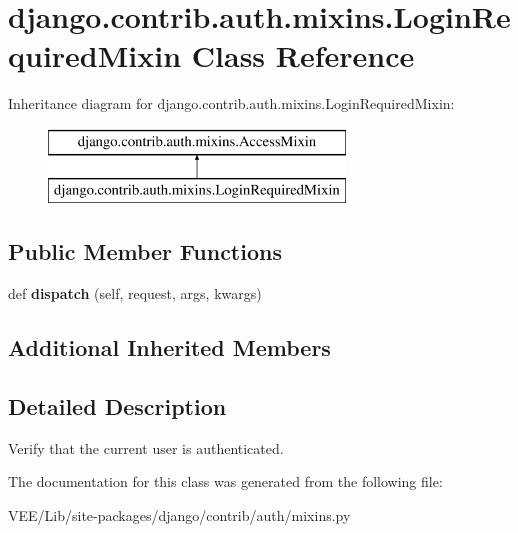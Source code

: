 \hypertarget{classdjango_1_1contrib_1_1auth_1_1mixins_1_1_login_required_mixin}{}\section{django.\+contrib.\+auth.\+mixins.\+Login\+Required\+Mixin Class Reference}
\label{classdjango_1_1contrib_1_1auth_1_1mixins_1_1_login_required_mixin}
Inheritance diagram for django.\+contrib.\+auth.\+mixins.\+Login\+Required\+Mixin\+:\begin{figure}[H]
\begin{center}
\leavevmode
\includegraphics[height=2.000000cm]{classdjango_1_1contrib_1_1auth_1_1mixins_1_1_login_required_mixin}
\end{center}
\end{figure}
\subsection*{Public Member Functions}
\begin{DoxyCompactItemize}
\item 
\mbox{\label{classdjango_1_1contrib_1_1auth_1_1mixins_1_1_login_required_mixin_a97958c982f493b73c9670ea820531cc1}} 
def {\bfseries dispatch} (self, request, args, kwargs)
\end{DoxyCompactItemize}
\subsection*{Additional Inherited Members}


\subsection{Detailed Description}
\begin{DoxyVerb}Verify that the current user is authenticated.\end{DoxyVerb}
 

The documentation for this class was generated from the following file\+:\begin{DoxyCompactItemize}
\item 
V\+E\+E/\+Lib/site-\/packages/django/contrib/auth/mixins.\+py\end{DoxyCompactItemize}
